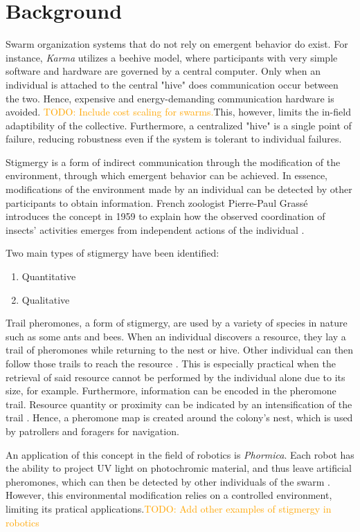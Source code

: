 \documentclass[a4paper, 12pt, twocolumn, times]{article}
\newcommand{\todo}[1]{\textcolor{orange}{TODO: #1}}
\begin{document}
\section{Background}
\par Swarm organization systems that do not rely on emergent behavior do exist. For instance, \textit{Karma} utilizes a beehive model, where participants with very simple software and hardware are governed by a central computer. Only when an individual is attached to the central "hive" does communication occur between the two. Hence, expensive and energy-demanding communication hardware is avoided. \todo{Include cost scaling for swarms.}This, however, limits the in-field adaptibility of the collective. Furthermore, a centralized "hive" is a single point of failure, reducing robustness even if the system is tolerant to individual failures.
\par Stigmergy is a form of indirect communication through the modification of the environment, through which emergent behavior can be achieved. In essence, modifications of the environment made by an individual can be detected by other participants to obtain information. French zoologist Pierre-Paul Grass\'e introduces the concept in 1959 to explain how the observed coordination of insects' activities emerges from independent actions of the individual \parencite{theraulaz_brief_1999}.
\par Two main types of stigmergy have been identified:
\begin{enumerate}
\item Quantitative
\item Qualitative
\end{enumerate}
\par Trail pheromones, a form of stigmergy, are used by a variety of species in nature such as some ants and bees. When an individual discovers a resource, they lay a trail of pheromones while returning to the nest or hive. Other individual can then follow those trails to reach the resource \parencite{carde_encyclopedia_2009}. This is especially practical when the retrieval of said resource cannot be performed by the individual alone due to its size, for example. Furthermore, information can be encoded in the pheromone trail. Resource quantity or proximity can be indicated by an intensification of the trail \parencite{carde_encyclopedia_2009}. Hence, a pheromone map is created around the colony's nest, which is used by patrollers and foragers for navigation.
\par An application of this concept in the field of robotics is \textit{Phormica}. Each robot has the ability to project UV light on photochromic material, and thus leave artificial pheromones, which can then be detected by other individuals of the swarm \parencite{salman_phormica_2020}. However, this environmental modification relies on a controlled environment, limiting its pratical applications.\todo{Add other examples of stigmergy in robotics}
\end{document}

